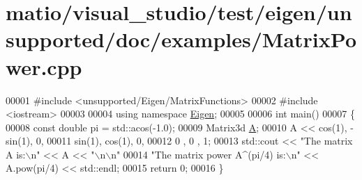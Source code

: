 \hypertarget{matio_2visual__studio_2test_2eigen_2unsupported_2doc_2examples_2_matrix_power_8cpp_source}{}\section{matio/visual\+\_\+studio/test/eigen/unsupported/doc/examples/\+Matrix\+Power.cpp}
\label{matio_2visual__studio_2test_2eigen_2unsupported_2doc_2examples_2_matrix_power_8cpp_source}

\begin{DoxyCode}
00001 \textcolor{preprocessor}{#include <unsupported/Eigen/MatrixFunctions>}
00002 \textcolor{preprocessor}{#include <iostream>}
00003 
00004 \textcolor{keyword}{using namespace }\hyperlink{namespace_eigen}{Eigen};
00005 
00006 \textcolor{keywordtype}{int} main()
00007 \{
00008   \textcolor{keyword}{const} \textcolor{keywordtype}{double} pi = std::acos(-1.0);
00009   Matrix3d \hyperlink{group___core___module_class_eigen_1_1_matrix}{A};
00010   A << cos(1), -sin(1), 0,
00011        sin(1),  cos(1), 0,
00012        0 ,      0 , 1;
00013   std::cout << \textcolor{stringliteral}{"The matrix A is:\(\backslash\)n"} << A << \textcolor{stringliteral}{"\(\backslash\)n\(\backslash\)n"}
00014            \textcolor{stringliteral}{"The matrix power A^(pi/4) is:\(\backslash\)n"} << A.pow(pi/4) << std::endl;
00015   \textcolor{keywordflow}{return} 0;
00016 \}
\end{DoxyCode}
